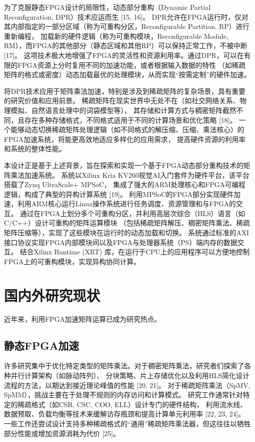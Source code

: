 为了克服静态FPGA设计的局限性，动态部分重构（Dynamic Partial Reconfiguration, DPR）技术应运而生 [15, 16]。
DPR允许在FPGA运行时，仅对其内部指定的一部分区域（称为可重构分区，Reconfigurable Partition, RP）进行重新编程，
加载新的硬件逻辑（称为可重构模块，Reconfigurable Module, RM），而FPGA的其他部分（静态区域和其他RP）可以保持正常工作，不被中断 [17]。
这项技术极大地增强了FPGA的灵活性和资源利用率。通过DPR，可以在有限的FPGA资源上分时复用不同的加速功能，或者根据输入数据的特性
（如稀疏矩阵的格式或密度）动态加载最优的处理模块，从而实现“按需定制”的硬件加速。

将DPR技术应用于矩阵乘法加速，特别是涉及到稀疏矩阵的复杂场景，具有重要的研究价值和应用前景。
稀疏矩阵在现实世界中无处不在（如社交网络关系、物理模拟、自然语言处理中的词袋模型等），
其存储和计算方式与稠密矩阵截然不同，且存在多种存储格式，不同格式适用于不同的计算场景和优化策略 [18]。
一个能够动态切换稀疏矩阵处理逻辑（如不同格式的解压缩、压缩、乘法核心）的FPGA加速系统，将能更高效地适应多样化的应用需求，
提高硬件资源的利用率和系统的整体性能。

本设计正是基于上述背景，旨在探索和实现一个基于FPGA动态部分重构技术的矩阵乘法加速系统。
系统以Xilinx Kria KV260视觉AI入门套件为硬件平台，该平台搭载了Zynq UltraScale+ MPSoC，
集成了强大的ARM处理核心和FPGA可编程逻辑，构成了典型的异构计算系统 [19]。
利用MPSoC的FPGA部分实现硬件加速，利用ARM核心运行Linux操作系统进行任务调度、资源管理和与FPGA的交互。
通过在FPGA上划分多个可重构分区，并利用高层次综合（HLS）语言（如C/C++）设计可重构的矩阵运算模块
（包括稀疏矩阵解压、稠密矩阵乘法、稀疏矩阵压缩等），实现了这些模块在运行时的动态加载和切换。
系统通过标准的AXI接口协议实现FPGA内部模块间以及FPGA与处理器系统（PS）端内存的数据交互。
结合Xilinx Runtime (XRT) 库，在运行于CPU上的应用程序可以方便地控制FPGA上的可重构模块，实现异构协同计算。

\section{国内外研究现状}

近年来，利用FPGA加速矩阵运算已成为研究热点。

\subsection{静态FPGA加速}

许多研究集中于优化特定类型的矩阵乘法。对于稠密矩阵乘法，研究者们探索了各种并行计算架构（如脉动阵列）、
分块策略、片上存储优化以及利用HLS简化设计流程的方法，以期达到接近理论峰值的性能 [20, 21]。
对于稀疏矩阵乘法（SpMV, SpMM），挑战主要在于处理不规则的内存访问和计算模式。
研究工作通常针对特定的稀疏格式（如CSR, CSC, COO, ELL）设计专门的硬件结构，
利用流水线、数据预取、负载均衡等技术来缓解访存瓶颈和提高计算单元利用率 [22, 23, 24]。
一些工作还尝试设计支持多种稀疏格式的“通用”稀疏矩阵乘法器，但这往往以牺牲部分性能或增加资源消耗为代价 [25]。

